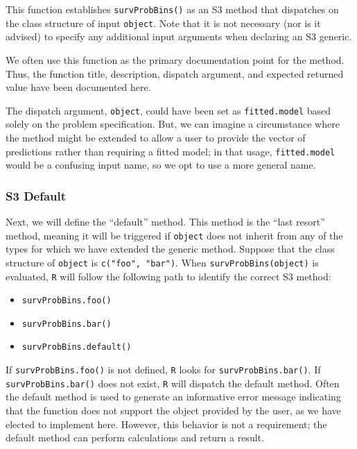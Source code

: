 \documentclass[
]{book}
\providecommand{\tightlist}{%
  \setlength{\itemsep}{0pt}\setlength{\parskip}{0pt}}
\begin{document}
This function establishes \texttt{survProbBins()} as an S3 method that dispatches on the class structure of input \texttt{object}. Note that it is not necessary (nor is it advised) to specify any additional input arguments when declaring an S3 generic.

We often use this function as the primary documentation point for the method. Thus, the function title, description, dispatch argument, and expected returned value have been documented here.

The dispatch argument, \texttt{object}, could have been set as \texttt{fitted.model} based solely on the problem specification. But, we can imagine a circumstance where the method might be extended to allow a user to provide the vector of predictions rather than requiring a fitted model; in that usage, \texttt{fitted.model} would be a confusing input name, so we opt to use a more general name.

\hypertarget{s3-default}{%
\subsubsection{S3 Default}\label{s3-default}}

Next, we will define the ``default'' method. This method is the ``last resort'' method, meaning it will be triggered if \texttt{object} does not inherit from any of the types for which we have extended the generic method. Suppose that the class structure of \texttt{object} is \texttt{c("foo",\ "bar")}. When \texttt{survProbBins(object)} is evaluated, \texttt{R} will follow the following path to identify the correct S3 method:

\begin{itemize}
\tightlist
\item
  \texttt{survProbBins.foo()}
\item
  \texttt{survProbBins.bar()}
\item
  \texttt{survProbBins.default()}
\end{itemize}

If \texttt{survProbBins.foo()} is not defined, \texttt{R} looks for \texttt{survProbBins.bar()}. If \texttt{survProbBins.bar()} does not exist, \texttt{R} will dispatch the default method. Often the default method is used to generate an informative error message indicating that the function does not support the object provided by the user, as we have elected to implement here. However, this behavior is not a requirement; the default method can perform calculations and return a result.
\end{document}
